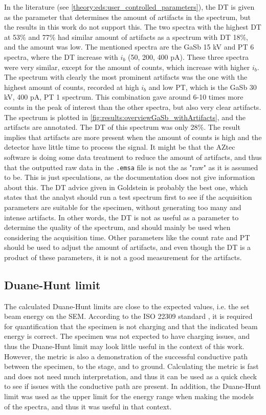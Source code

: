 In the literature (see \cref{theory:eds:user_controlled_parameters}), the DT is given as the parameter that determines the amount of artifacts in the spectrum, but the results in this work do not support this.
The two spectra with the highest DT at 53\% and 77\% had similar amount of artifacts as a spectrum with DT 18\%, and the amount was low.
The mentioned spectra are the GaSb 15 kV and PT 6 spectra, where the DT increase with $i_b$ (50, 200, 400 pA).
These three spectra were very similar, except for the amount of counts, which increase with higher $i_b$.
The spectrum with clearly the most prominent artifacts was the one with the highest amount of counts, recorded at high $i_b$ and low PT, which is the GaSb 30 kV, 400 pA, PT 1 spectrum.
This combination gave around 6-10 times more counts in the peak of interest than the other spectra, but also very clear artifacts.
The spectrum is plotted in \cref{fig:results:overviewGaSb_withArtifacts}, and the artifacts are annotated.
The DT of this spectrum was only 28\%.
The result implies that artifacts are more present when the amount of counts is high and the detector have little time to process the signal.
It might be that the AZtec software is doing some data treatment to reduce the amount of artifacts, and thus that the outputted raw data in the \verb|.emsa| file is not the as "raw" as it is assumed to be.
This is just speculations, as the documentation does not give information about this.
The DT advice given in Goldstein is probably the best one, which states that the analyst should run a test spectrum first to see if the acquisition parameters are suitable for the specimen, without generating too many and intense artifacts.
In other words, the DT is not as useful as a parameter to determine the quality of the spectrum, and should mainly be used when considering the acquisition time.
Other parameters like the count rate and PT should be used to adjust the amount of artifacts, and even though the DT is a product of these parameters, it is not a good measurement for the artifacts.



\subsection{Duane-Hunt limit}
\label{discussion:duane_hunt}

The calculated Duane-Hunt limits are close to the expected values, i.e. the set beam energy on the SEM.
According to the ISO 22309 standard \cite{iso_quantification_22309}, it is required for quantification that the specimen is not charging and that the indicated beam energy is correct.
The specimen was not expected to have charging issues, and thus the Duane-Hunt limit may look little useful in the context of this work.
However, the metric is also a demonstration of the successful conductive path between the specimen, to the stage, and to ground.
Calculating the metric is fast and does not need much interpretation, and thus it can be used as a quick check to see if issues with the conductive path are present.
In addition, the Duane-Hunt limit was used as the upper limit for the energy range when making the models of the spectra, and thus it was useful in that context.

